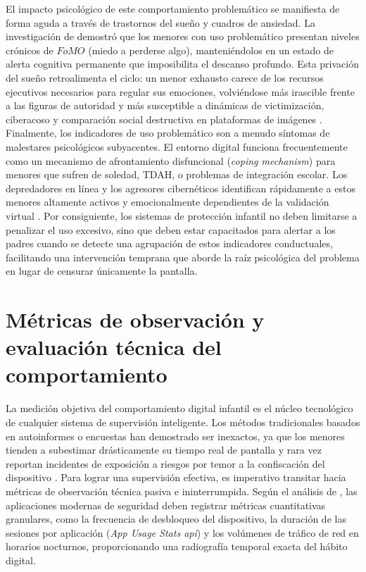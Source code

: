 El impacto psicológico de este comportamiento problemático se manifiesta de forma aguda a través de trastornos del sueño y cuadros de ansiedad. La investigación de \cite{soriano-molina_association_2025} demostró que los menores con uso problemático presentan niveles crónicos de $FoMO$ (miedo a perderse algo), manteniéndolos en un estado de alerta cognitiva permanente que imposibilita el descanso profundo. Esta privación del sueño retroalimenta el ciclo: un menor exhausto carece de los recursos ejecutivos necesarios para regular sus emociones, volviéndose más irascible frente a las figuras de autoridad y más susceptible a dinámicas de victimización, ciberacoso y comparación social destructiva en plataformas de imágenes \cite{martin-barrado_association_2025}.\\

Finalmente, los indicadores de uso problemático son a menudo síntomas de malestares psicológicos subyacentes. El entorno digital funciona frecuentemente como un mecanismo de afrontamiento disfuncional (\textit{coping mechanism}) para menores que sufren de soledad, TDAH, o problemas de integración escolar. Los depredadores en línea y los agresores cibernéticos identifican rápidamente a estos menores altamente activos y emocionalmente dependientes de la validación virtual \cite{page_psychological_2025}. Por consiguiente, los sistemas de protección infantil no deben limitarse a penalizar el uso excesivo, sino que deben estar capacitados para alertar a los padres cuando se detecte una agrupación de estos indicadores conductuales, facilitando una intervención temprana que aborde la raíz psicológica del problema en lugar de censurar únicamente la pantalla.\\

\section{Métricas de observación y evaluación técnica del comportamiento}

La medición objetiva del comportamiento digital infantil es el núcleo tecnológico de cualquier sistema de supervisión inteligente. Los métodos tradicionales basados en autoinformes o encuestas han demostrado ser inexactos, ya que los menores tienden a subestimar drásticamente su tiempo real de pantalla y rara vez reportan incidentes de exposición a riesgos por temor a la confiscación del dispositivo \cite{alsoubai_profiling_2024}. Para lograr una supervisión efectiva, es imperativo transitar hacia métricas de observación técnica pasiva e ininterrumpida. Según el análisis de \cite{alqahtani_childrens_2023}, las aplicaciones modernas de seguridad deben registrar métricas cuantitativas granulares, como la frecuencia de desbloqueo del dispositivo, la duración de las sesiones por aplicación (\textit{App Usage Stats \gls{api}}) y los volúmenes de tráfico de red en horarios nocturnos, proporcionando una radiografía temporal exacta del hábito digital.\\

